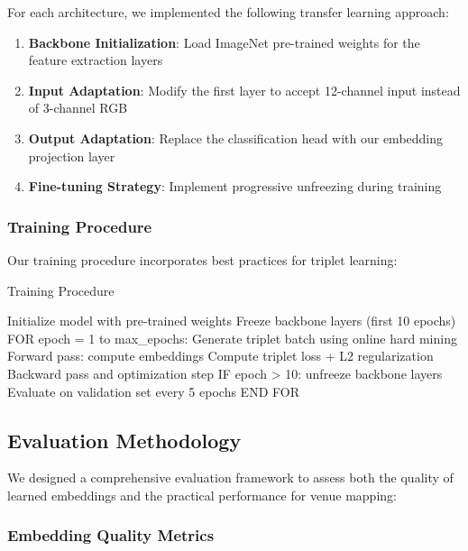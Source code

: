 For each architecture, we implemented the following transfer learning approach:

\begin{enumerate}
    \item \textbf{Backbone Initialization}: Load ImageNet pre-trained weights for the feature extraction layers
    \item \textbf{Input Adaptation}: Modify the first layer to accept 12-channel input instead of 3-channel RGB
    \item \textbf{Output Adaptation}: Replace the classification head with our embedding projection layer
    \item \textbf{Fine-tuning Strategy}: Implement progressive unfreezing during training
\end{enumerate}

\subsubsection{Training Procedure}

Our training procedure incorporates best practices for triplet learning:

\begin{algorithm}
\caption{Training Procedure}
\begin{algorithmic}
\STATE Initialize model with pre-trained weights
\STATE Freeze backbone layers (first 10 epochs)
\STATE FOR epoch = 1 to max\_epochs:
\STATE \quad Generate triplet batch using online hard mining
\STATE \quad Forward pass: compute embeddings
\STATE \quad Compute triplet loss + L2 regularization
\STATE \quad Backward pass and optimization step
\STATE \quad IF epoch > 10: unfreeze backbone layers
\STATE \quad Evaluate on validation set every 5 epochs
\STATE END FOR
\end{algorithmic}
\end{algorithm}

\subsection{Evaluation Methodology}

We designed a comprehensive evaluation framework to assess both the quality of learned embeddings and the practical performance for venue mapping:

\subsubsection{Embedding Quality Metrics}


